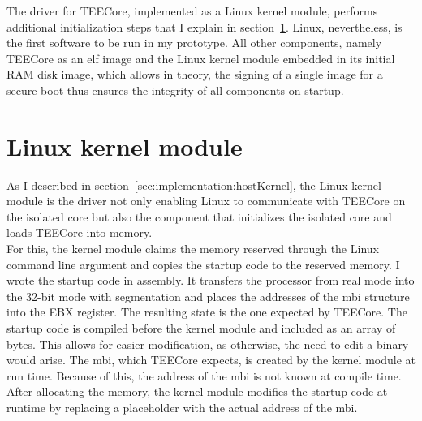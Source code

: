 The driver for TEECore, implemented as a Linux kernel module, performs
additional initialization steps that I explain in
section~\ref{sec:implementation:kmod}. Linux, nevertheless, is the first
software to be run in my prototype. All other components, namely TEECore as an
\gls{elf} image and the Linux kernel module embedded in its initial RAM disk
image, which allows in theory, the signing of a single image for a secure boot
thus ensures the integrity of all components on startup.\\

\section{Linux kernel module}
\label{sec:implementation:kmod}
As I described in section~\ref{sec:implementation:hostKernel}, the Linux kernel
module is the driver not only enabling Linux to communicate with TEECore on the
isolated core but also the component that initializes the isolated core and
loads TEECore into memory.\\

For this, the kernel module claims the memory reserved through the Linux command
line argument and copies the startup code to the reserved memory. I wrote the
startup code in assembly. It transfers the processor from real mode into the
32-bit mode with segmentation and places the addresses of the \gls{mbi}
structure into the EBX register. The resulting state is the one expected by
TEECore. The startup code is compiled before the kernel module and included as
an array of bytes. This allows for easier modification, as otherwise, the need
to edit a binary would arise. The \gls{mbi}, which TEECore expects, is created
by the kernel module at run time. Because of this, the address of the \gls{mbi}
is not known at compile time. After allocating the memory, the kernel module
modifies the startup code at runtime by replacing a placeholder with the actual
address of the \gls{mbi}.\\

